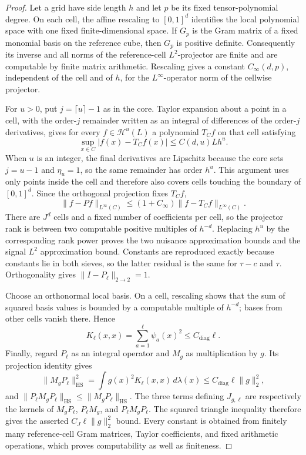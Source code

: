 \documentclass{article}
\begin{document}
\begin{proof}
Let a grid have side length \(h\) and let \(p\) be its fixed tensor-polynomial degree.  On each cell, the affine rescaling to \([0,1]^d\) identifies the local polynomial space with one fixed finite-dimensional space.  If \(G_p\) is the Gram matrix of a fixed monomial basis on the reference cube, then \(G_p\) is positive definite.  Consequently its inverse and all norms of the reference-cell \(L^2\)-projector are finite and are computable by finite matrix arithmetic.  Rescaling gives a constant \(C_\infty(d,p)\), independent of the cell and of \(h\), for the \(L^\infty\)-operator norm of the cellwise projector.

For \(u>0\), put \(j=\lceil u\rceil-1\) as in the core.  Taylor expansion about a point in a cell, with the order-\(j\) remainder written as an integral of differences of the order-\(j\) derivatives, gives for every \(f\in\mathcal H^u(L)\) a polynomial \(T_Cf\) on that cell satisfying
\[
 \sup_{x\in C}|f(x)-T_Cf(x)|
 \le C(d,u)Lh^u.
\]
When \(u\) is an integer, the final derivatives are Lipschitz because the core sets \(j=u-1\) and \(\eta_u=1\), so the same remainder has order \(h^u\).  This argument uses only points inside the cell and therefore also covers cells touching the boundary of \([0,1]^d\).  Since the orthogonal projection fixes \(T_Cf\),
\[
 \|f-Pf\|_{L^\infty(C)}
 \le(1+C_\infty)\|f-T_Cf\|_{L^\infty(C)}.
\]
There are \(J^d\) cells and a fixed number of coefficients per cell, so the projector rank is between two computable positive multiples of \(h^{-d}\).  Replacing \(h^u\) by the corresponding rank power proves the two nuisance approximation bounds and the signal \(L^2\) approximation bound.  Constants are reproduced exactly because constants lie in both sieves, so the latter residual is the same for \(\tau-c\) and \(\tau\).  Orthogonality gives \(\|I-P_\ell\|_{2\to2}=1\).

Choose an orthonormal local basis.  On a cell, rescaling shows that the sum of squared basis values is bounded by a computable multiple of \(h^{-d}\); bases from other cells vanish there.  Hence
\[
 K_\ell(x,x)=\sum_{a=1}^{\ell}\psi_a(x)^2\le C_{\mathrm{diag}}\ell.
\]
Finally, regard \(P_\ell\) as an integral operator and \(M_g\) as multiplication by \(g\).  Its projection identity gives
\[
 \|M_gP_\ell\|_{\mathrm{HS}}^2
 =\int g(x)^2K_\ell(x,x)\,d\lambda(x)
 \le C_{\mathrm{diag}}\ell\|g\|_2^2,
\]
and \(\|P_\ell M_gP_\ell\|_{\mathrm{HS}}\le\|M_gP_\ell\|_{\mathrm{HS}}\).  The three terms defining \(J_{g,\ell}\) are respectively the kernels of \(M_gP_\ell\), \(P_\ell M_g\), and \(P_\ell M_gP_\ell\).  The squared triangle inequality therefore gives the asserted \(C_J\ell\|g\|_2^2\) bound.  Every constant is obtained from finitely many reference-cell Gram matrices, Taylor coefficients, and fixed arithmetic operations, which proves computability as well as finiteness.
\end{proof}
\end{document}
